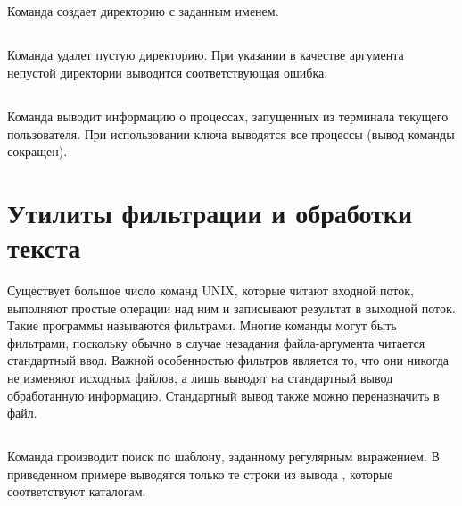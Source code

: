 \vspace{-1em}
\subsection{}

Команда  создает директорию с заданным именем.


\vspace{-1em}
\subsection{}

Команда  удалет пустую директорию. При указании в качестве аргумента непустой директории выводится соответствующая ошибка.


\vspace{-1em}
\subsection{}

Команда  выводит информацию о процессах, запущенных из терминала текущего пользователя. При использовании ключа  выводятся все процессы (вывод команды  сокращен).


\section{Утилиты фильтрации и обработки текста}

Существует большое число команд UNIX, которые читают входной поток, выполняют простые операции над ним и записывают результат в выходной поток. Такие программы называются фильтрами. Многие команды могут быть фильтрами, поскольку обычно в случае незадания файла-аргумента читается стандартный ввод. Важной особенностью фильтров является то, что они никогда не изменяют исходных файлов, а лишь выводят на стандартный вывод обработанную информацию. Стандартный вывод также можно переназначить в файл.

\subsection{}

Команда  производит поиск по шаблону, заданному регулярным выражением. В приведенном примере выводятся только те строки из вывода , которые соответствуют каталогам.


